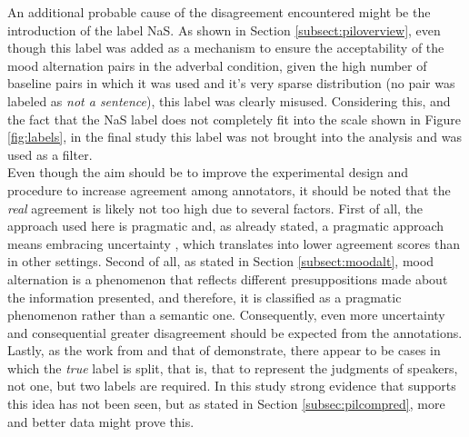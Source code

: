 An additional probable cause of the disagreement encountered might be the introduction of the label NaS. As shown in Section \ref{subsect:piloverview}, even though this label was added as a mechanism to ensure the acceptability of the mood alternation pairs in the adverbal condition, given the high number of baseline pairs in which it was used and it's very sparse distribution (no pair was labeled as \textit{not a sentence}), this label was clearly misused. Considering this, and the fact that the NaS label does not completely fit into the scale shown in Figure \ref{fig:labels}, in the final study this label was not brought into the analysis and was used as a filter.\\

Even though the aim should be to improve the experimental design and procedure to increase agreement among annotators, it should be noted that the \textit{real} agreement is likely not too high due to several factors. First of all, the approach used here is pragmatic and, as already stated, a pragmatic approach means embracing uncertainty \citep{de2012did}, which translates into lower agreement scores than in other settings. Second of all, as stated in Section \ref{subsect:moodalt}, mood alternation is a phenomenon that reflects different presuppositions made about the information presented, and therefore, it is classified as a pragmatic phenomenon rather than a semantic one. Consequently, even more uncertainty and consequential greater disagreement should be expected from the annotations. Lastly, as the work from \citet{de2012did} and that of \citet{pavlick2019inherent} demonstrate, there appear to be cases in which the \textit{true} label is split, that is, that to represent the judgments of speakers, not one, but two labels are required. In this study strong evidence that supports this idea has not been seen, but as stated in Section \ref{subsec:pilcompred}, more and better data might prove this.\\

